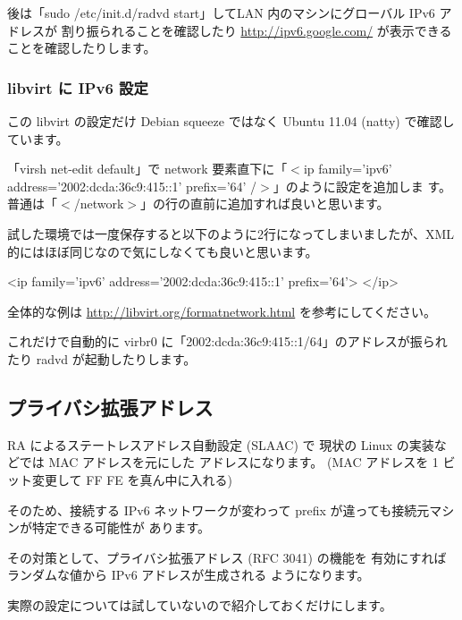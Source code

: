 \documentclass[mingoth,a4paper]{jsarticle}
\begin{document}
後は「sudo /etc/init.d/radvd start」してLAN 内のマシンにグローバル IPv6 アドレスが
割り振られることを確認したり \url{http://ipv6.google.com/} が表示できることを確認したりします。
\subsubsection{libvirt に IPv6 設定}

この libvirt の設定だけ Debian squeeze ではなく Ubuntu 11.04 (natty) で確認しています。

「virsh net-edit default」で network 要素直下に「$<$ip family='ipv6'
address='2002:dcda:36c9:415::1' prefix='64' /$>$」のように設定を追加しま
す。普通は「$<$/network$>$」の行の直前に追加すれば良いと思います。

試した環境では一度保存すると以下のように2行になってしまいましたが、XML
的にはほぼ同じなので気にしなくても良いと思います。

\begin{commandline}
<ip family='ipv6' address='2002:dcda:36c9:415::1' prefix='64'>
</ip>
\end{commandline}

全体的な例は \url{http://libvirt.org/formatnetwork.html} を参考にしてください。

これだけで自動的に virbr0 に「2002:dcda:36c9:415::1/64」のアドレスが振られたり radvd が起動したりします。
\subsection{プライバシ拡張アドレス}

RA によるステートレスアドレス自動設定 (SLAAC) で
現状の Linux の実装などでは MAC アドレスを元にした
アドレスになります。
(MAC アドレスを 1 ビット変更して FF FE を真ん中に入れる)

そのため、接続する IPv6 ネットワークが変わって
prefix が違っても接続元マシンが特定できる可能性が
あります。

その対策として、プライバシ拡張アドレス (RFC 3041) の機能を
有効にすればランダムな値から IPv6 アドレスが生成される
ようになります。

実際の設定については試していないので紹介しておくだけにします。
\end{document}
